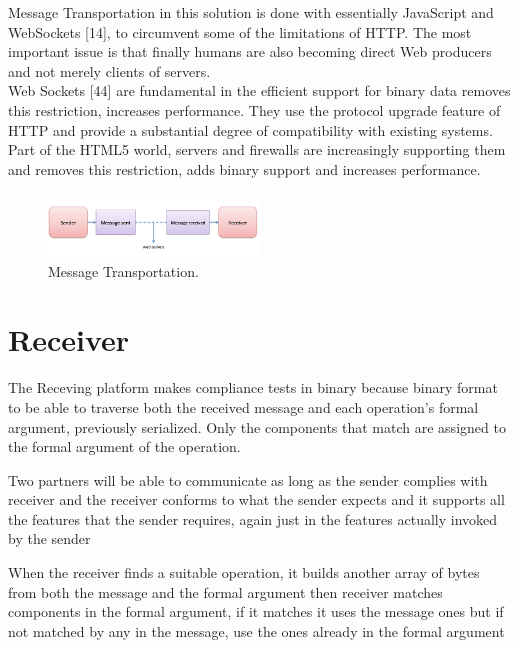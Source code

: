 Message Transportation in this solution is done with essentially JavaScript and WebSockets [14], to circumvent some of the limitations of HTTP.
The most important issue is that finally humans are also becoming direct Web producers and not merely clients of servers.\\

Web Sockets [44] are fundamental in the efficient support for binary data removes this restriction, increases performance.
They use the protocol upgrade feature of HTTP and
provide a substantial degree of compatibility with existing systems. Part of the HTML5 world, servers and firewalls are
increasingly supporting them and removes this restriction, adds binary support and increases performance.

\begin{figure}[!htb]
  \centering
  \includegraphics[width=0.5\textwidth]{Figures/websocket.png}
  \caption[Message Transportation.]{Message Transportation.}
  \label{fig:websocket}
\end{figure}

\section{Receiver}
\label{section:receiver}

The Receving platform makes compliance tests in binary because binary format to be able to traverse both the received message
and each operation’s formal argument, previously serialized. Only the components that match are assigned to the formal argument of the operation.

Two partners will be able to communicate as long as the sender complies with receiver and the receiver conforms to what the
sender expects and it supports all the features that the sender requires, again just in the features actually invoked by the
sender

When the receiver finds a suitable operation, it builds another array of bytes from both the message and the formal argument
then receiver matches components in the formal argument, if it matches it uses the message ones but if not matched by any in the message,
use the ones already in the formal argument

